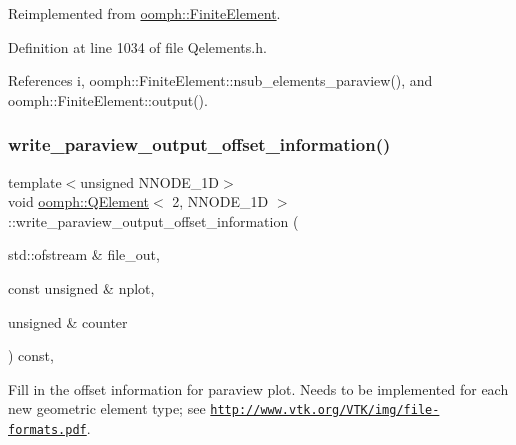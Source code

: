 Reimplemented from \hyperlink{classoomph_1_1FiniteElement_af11d35779224185e6693f2db450cc111}{oomph\+::\+Finite\+Element}.



Definition at line 1034 of file Qelements.\+h.



References i, oomph\+::\+Finite\+Element\+::nsub\+\_\+elements\+\_\+paraview(), and oomph\+::\+Finite\+Element\+::output().

\mbox{\label{classoomph_1_1QElement_3_012_00_01NNODE__1D_01_4_a9378c8bab357de6f4d8a89fd1ba61771}} 
\subsubsection{\texorpdfstring{write\+\_\+paraview\+\_\+output\+\_\+offset\+\_\+information()}{write\_paraview\_output\_offset\_information()}}
{\footnotesize\ttfamily template$<$unsigned N\+N\+O\+D\+E\+\_\+1D$>$ \\
void \hyperlink{classoomph_1_1QElement}{oomph\+::\+Q\+Element}$<$ 2, N\+N\+O\+D\+E\+\_\+1D $>$\+::write\+\_\+paraview\+\_\+output\+\_\+offset\+\_\+information (\begin{DoxyParamCaption}\item[{std\+::ofstream \&}]{file\+\_\+out,  }\item[{const unsigned \&}]{nplot,  }\item[{unsigned \&}]{counter }\end{DoxyParamCaption}) const\hspace{0.3cm}{\ttfamily [inline]}, {\ttfamily [virtual]}}



Fill in the offset information for paraview plot. Needs to be implemented for each new geometric element type; see \href{http://www.vtk.org/VTK/img/file-formats.pdf}{\tt http\+://www.\+vtk.\+org/\+V\+T\+K/img/file-\/formats.\+pdf}. 



